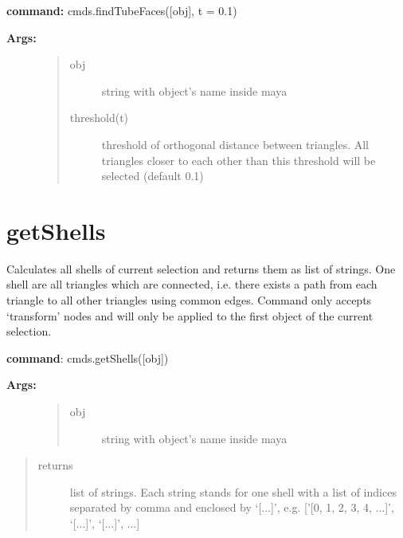 \documentclass[letterpaper,10pt,english]{sphinxmanual}
\begin{document}
\textbf{command:} cmds.findTubeFaces({[}obj{]}, t = 0.1)
\begin{description}
\item[{\textbf{Args:}}] \leavevmode\begin{quote}\begin{description}
\item[{obj}] \leavevmode
string with object's name inside maya

\item[{threshold(t)}] \leavevmode
threshold of orthogonal distance between triangles. All triangles closer to each other than this threshold will be selected (default 0.1)

\end{description}\end{quote}

\end{description}


\section{getShells}
\label{pk_src.getShells:getshells}\label{pk_src.getShells::doc}\label{pk_src.getShells:id1}
{\hyperref[index:commands]{}}
\label{pk_src.getShells:module-pk_src.getShells}
Calculates all shells of current selection and returns them as list of strings. One shell are all triangles which are connected, i.e. there exists a path from each triangle to all other triangles using common edges.
Command only accepts `transform' nodes and will only be applied to the first object of the current selection.

\textbf{command}: cmds.getShells({[}obj{]})
\begin{description}
\item[{\textbf{Args:}}] \leavevmode\begin{quote}\begin{description}
\item[{obj}] \leavevmode
string with object's name inside maya

\end{description}\end{quote}

\end{description}
\begin{quote}\begin{description}
\item[{returns}] \leavevmode
list of strings. Each string stands for one shell with a list of indices separated by comma and enclosed by `{[}...{]}', e.g. {[}'{[}0, 1, 2, 3, 4, ...{]}', `{[}...{]}', `{[}...{]}', ...{]}

\end{description}\end{quote}
\end{document}
